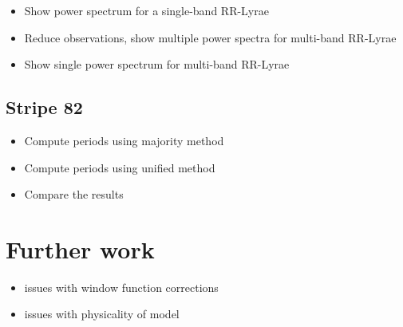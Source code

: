\documentclass[12pt,preprint]{aastex}
\begin{document}
\begin{itemize}
  \item Show power spectrum for a single-band RR-Lyrae
  \item Reduce observations, show multiple power spectra for multi-band RR-Lyrae
  \item Show single power spectrum for multi-band RR-Lyrae
\end{itemize}

\subsection{Stripe 82}

\begin{itemize}
  \item Compute periods using majority method
  \item Compute periods using unified method
  \item Compare the results
\end{itemize}

\section{Further work}

\begin{itemize}
  \item issues with window function corrections
  \item issues with physicality of model
\end{itemize}





\end{document}
